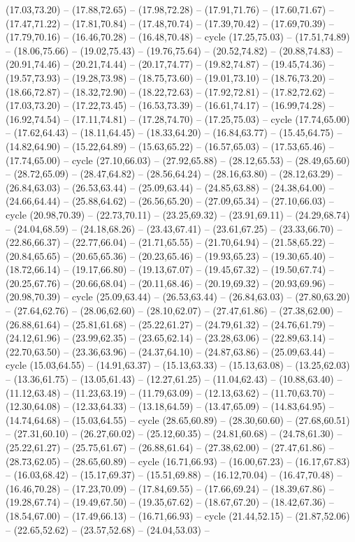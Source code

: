 {(17.03,73.20) -- (17.88,72.65) -- (17.98,72.28) -- (17.91,71.76) -- (17.60,71.67) -- (17.47,71.22) -- (17.81,70.84) -- (17.48,70.74) -- (17.39,70.42) -- (17.69,70.39) -- (17.79,70.16) -- (16.46,70.28) -- (16.48,70.48) -- cycle (17.25,75.03) -- (17.51,74.89) -- (18.06,75.66) -- (19.02,75.43) -- (19.76,75.64) -- (20.52,74.82) -- (20.88,74.83) -- (20.91,74.46) -- (20.21,74.44) -- (20.17,74.77) -- (19.82,74.87) -- (19.45,74.36) -- (19.57,73.93) -- (19.28,73.98) -- (18.75,73.60) -- (19.01,73.10) -- (18.76,73.20) -- (18.66,72.87) -- (18.32,72.90) -- (18.22,72.63) -- (17.92,72.81) -- (17.82,72.62) -- (17.03,73.20) -- (17.22,73.45) -- (16.53,73.39) -- (16.61,74.17) -- (16.99,74.28) -- (16.92,74.54) -- (17.11,74.81) -- (17.28,74.70) -- (17.25,75.03) -- cycle (17.74,65.00) -- (17.62,64.43) -- (18.11,64.45) -- (18.33,64.20) -- (16.84,63.77) -- (15.45,64.75) -- (14.82,64.90) -- (15.22,64.89) -- (15.63,65.22) -- (16.57,65.03) -- (17.53,65.46) -- (17.74,65.00) -- cycle (27.10,66.03) -- (27.92,65.88) -- (28.12,65.53) -- (28.49,65.60) -- (28.72,65.09) -- (28.47,64.82) -- (28.56,64.24) -- (28.16,63.80) -- (28.12,63.29) -- (26.84,63.03) -- (26.53,63.44) -- (25.09,63.44) -- (24.85,63.88) -- (24.38,64.00) -- (24.66,64.44) -- (25.88,64.62) -- (26.56,65.20) -- (27.09,65.34) -- (27.10,66.03) -- cycle (20.98,70.39) -- (22.73,70.11) -- (23.25,69.32) -- (23.91,69.11) -- (24.29,68.74) -- (24.04,68.59) -- (24.18,68.26) -- (23.43,67.41) -- (23.61,67.25) -- (23.33,66.70) -- (22.86,66.37) -- (22.77,66.04) -- (21.71,65.55) -- (21.70,64.94) -- (21.58,65.22) -- (20.84,65.65) -- (20.65,65.36) -- (20.23,65.46) -- (19.93,65.23) -- (19.30,65.40) -- (18.72,66.14) -- (19.17,66.80) -- (19.13,67.07) -- (19.45,67.32) -- (19.50,67.74) -- (20.25,67.76) -- (20.66,68.04) -- (20.11,68.46) -- (20.19,69.32) -- (20.93,69.96) -- (20.98,70.39) -- cycle (25.09,63.44) -- (26.53,63.44) -- (26.84,63.03) -- (27.80,63.20) -- (27.64,62.76) -- (28.06,62.60) -- (28.10,62.07) -- (27.47,61.86) -- (27.38,62.00) -- (26.88,61.64) -- (25.81,61.68) -- (25.22,61.27) -- (24.79,61.32) -- (24.76,61.79) -- (24.12,61.96) -- (23.99,62.35) -- (23.65,62.14) -- (23.28,63.06) -- (22.89,63.14) -- (22.70,63.50) -- (23.36,63.96) -- (24.37,64.10) -- (24.87,63.86) -- (25.09,63.44) -- cycle (15.03,64.55) -- (14.91,63.37) -- (15.13,63.33) -- (15.13,63.08) -- (13.25,62.03) -- (13.36,61.75) -- (13.05,61.43) -- (12.27,61.25) -- (11.04,62.43) -- (10.88,63.40) -- (11.12,63.48) -- (11.23,63.19) -- (11.79,63.09) -- (12.13,63.62) -- (11.70,63.70) -- (12.30,64.08) -- (12.33,64.33) -- (13.18,64.59) -- (13.47,65.09) -- (14.83,64.95) -- (14.74,64.68) -- (15.03,64.55) -- cycle (28.65,60.89) -- (28.30,60.60) -- (27.68,60.51) -- (27.31,60.10) -- (26.27,60.02) -- (25.12,60.35) -- (24.81,60.68) -- (24.78,61.30) -- (25.22,61.27) -- (25.75,61.67) -- (26.88,61.64) -- (27.38,62.00) -- (27.47,61.86) -- (28.73,62.05) -- (28.65,60.89) -- cycle (16.71,66.93) -- (16.00,67.23) -- (16.17,67.83) -- (16.03,68.42) -- (15.17,69.37) -- (15.51,69.88) -- (16.12,70.04) -- (16.47,70.48) -- (16.46,70.28) -- (17.23,70.09) -- (17.84,69.55) -- (17.66,69.24) -- (18.39,67.86) -- (19.28,67.74) -- (19.49,67.50) -- (19.35,67.62) -- (18.67,67.20) -- (18.42,67.36) -- (18.54,67.00) -- (17.49,66.13) -- (16.71,66.93) -- cycle (21.44,52.15) -- (21.87,52.06) -- (22.65,52.62) -- (23.57,52.68) -- (24.04,53.03) -- }
